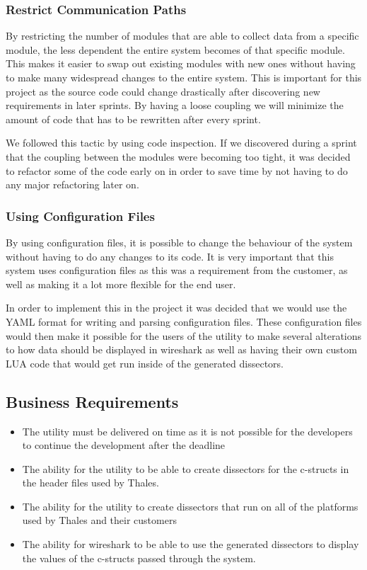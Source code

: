 \subsubsection{Restrict Communication Paths}
By restricting the number of modules that are able to collect data from a specific module, the less dependent the entire system becomes of that specific module. This makes it easier to swap out existing modules with new ones without having to make many widespread changes to the entire system. This is important for this project as the source code could change drastically after discovering new requirements in later sprints. By having a loose coupling we will minimize the amount of code that has to be rewritten after every sprint.

We followed this tactic by using code inspection. If we discovered during a sprint that the coupling between the modules were becoming too tight, it was decided to refactor some of the code early on in order to save time by not having to do any major refactoring later on.

\subsubsection{Using Configuration Files}
By using configuration files, it is possible to change the behaviour of the system without having to do any changes to its code. It is very important that this system uses configuration files as this was a requirement from the customer, as well as making it a lot more flexible for the end user.

In order to implement this in the project it was decided that we would use the YAML format for writing and parsing configuration files. These configuration files would then make it possible for the users of the utility to make several alterations to how data should be displayed in wireshark as well as having their own custom LUA code that would get run inside of the generated dissectors.

\subsection{Business Requirements}
\begin{itemize}
\item The \gls{utility} must be delivered on time as it is not possible for the developers to continue the development after the deadline
\item The ability for the \gls{utility} to be able to create dissectors for the c-structs in the header files used  by Thales.
\item The ability for the \gls{utility} to create dissectors that run on all of the platforms used by Thales and their customers
\item The ability for \Gls{wireshark} to be able to use the generated dissectors to display the values of the c-structs passed through the system.
\end{itemize}

